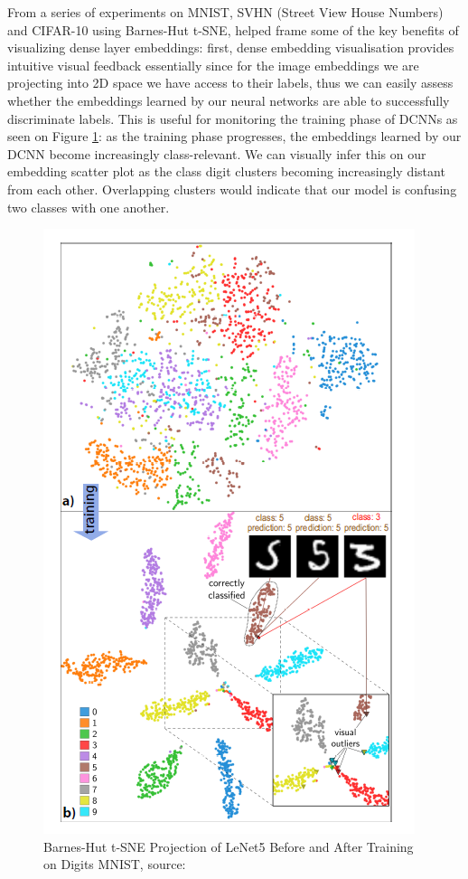 From a series of experiments on MNIST, SVHN (Street View House Numbers) and CIFAR-10 using Barnes-Hut t-SNE, \cite{Rauber2017VisualizingTH} helped frame some of the key benefits of visualizing dense layer embeddings: first, dense embedding visualisation provides intuitive visual feedback essentially since for the image embeddings we are projecting into 2D space we have access to their labels, thus we can easily assess whether the embeddings learned by our neural networks are able to successfully discriminate labels. This is useful for monitoring the training phase of DCNNs as seen on Figure \ref{fig:HRV_006_Rauber_B}: as the training phase progresses, the embeddings learned by our DCNN become increasingly class-relevant. We can visually infer this on our embedding scatter plot as the class digit clusters becoming increasingly distant from each other. Overlapping clusters would indicate that our model is confusing two classes with one another.

\vspace{0.2cm}

\begin{figure}[H]
	\centering
	\includegraphics[scale=0.9]{images/embedding_view/HRV_Fig_006_Rauber_B.PNG}
	\caption{Barnes-Hut t-SNE Projection of LeNet5 Before and After Training on Digits MNIST, source: \cite{Rauber2017VisualizingTH}}
	\label{fig:HRV_006_Rauber_B}
\end{figure}

